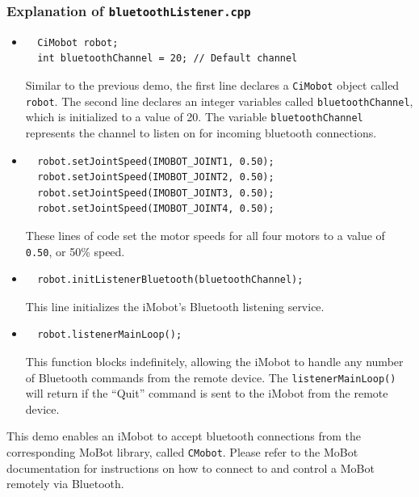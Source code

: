 \documentclass[11pt]{report}
\begin{document}
\subsubsection{Explanation of \texttt{bluetoothListener.cpp}}
\begin{itemize}
\item 
\begin{verbatim}
  CiMobot robot;
  int bluetoothChannel = 20; // Default channel
\end{verbatim}
Similar to the previous demo, the first line declares a \texttt{CiMobot} object
called \texttt{robot}. The second line declares an integer variables called 
\texttt{bluetoothChannel}, which is initialized to a value of 20. The 
variable \texttt{bluetoothChannel} represents the channel to listen on
for incoming bluetooth connections.
\item
\begin{verbatim}
  robot.setJointSpeed(IMOBOT_JOINT1, 0.50);
  robot.setJointSpeed(IMOBOT_JOINT2, 0.50);
  robot.setJointSpeed(IMOBOT_JOINT3, 0.50);
  robot.setJointSpeed(IMOBOT_JOINT4, 0.50);
\end{verbatim}
These lines of code set the motor speeds for all four motors to a value of
\texttt{0.50}, or 50\% speed.
\item
\begin{verbatim}
  robot.initListenerBluetooth(bluetoothChannel);
\end{verbatim}
This line initializes the iMobot's Bluetooth listening service. 
\item
\begin{verbatim}
  robot.listenerMainLoop();
\end{verbatim}
This function blocks indefinitely, allowing the iMobot to handle any number of Bluetooth
commands from the remote device. The \texttt{listenerMainLoop()} will return if the
``Quit'' command is sent to the iMobot from the remote device.
\end{itemize}

This demo enables an iMobot to accept bluetooth connections from the corresponding
MoBot library, called \texttt{CMobot}. Please refer to the MoBot documentation
for instructions on how to connect to and control a MoBot remotely via Bluetooth.

\appendix
\end{document}
